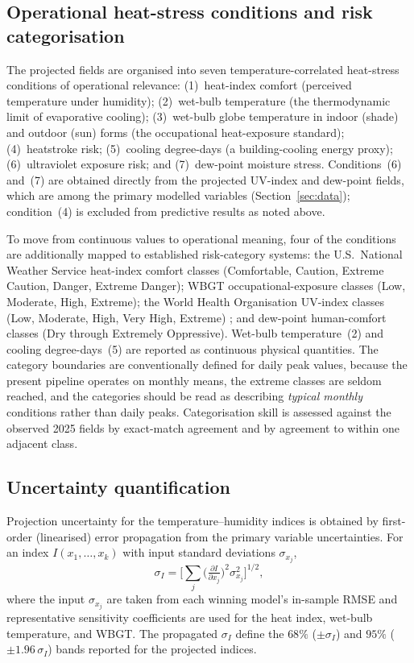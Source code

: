 \documentclass[pdflatex,sn-basic,lineno]{sn-jnl}
\begin{document}
\subsection{Operational heat-stress conditions and risk categorisation}
\label{sec:conditions}
The projected fields are organised into seven temperature-correlated heat-stress
conditions of operational relevance: (1)~heat-index comfort (perceived
temperature under humidity); (2)~wet-bulb temperature (the thermodynamic limit of
evaporative cooling); (3)~wet-bulb globe temperature in indoor (shade) and outdoor
(sun) forms (the occupational heat-exposure standard); (4)~heatstroke risk;
(5)~cooling degree-days (a building-cooling energy proxy); (6)~ultraviolet
exposure risk; and (7)~dew-point moisture stress. Conditions~(6) and~(7) are
obtained directly from the projected UV-index and dew-point fields, which are
among the primary modelled variables (Section~\ref{sec:data}); condition~(4) is
excluded from predictive results as noted above.

To move from continuous values to operational meaning, four of the conditions are
additionally mapped to established risk-category systems: the U.S.\ National
Weather Service heat-index comfort classes (Comfortable, Caution, Extreme
Caution, Danger, Extreme Danger); WBGT occupational-exposure classes (Low,
Moderate, High, Extreme); the World Health Organisation UV-index classes (Low,
Moderate, High, Very High, Extreme) \citep{who2002}; and dew-point human-comfort
classes (Dry through Extremely Oppressive). Wet-bulb temperature~(2) and cooling
degree-days~(5) are reported as continuous physical quantities. The category
boundaries are conventionally defined for daily peak values, because the present
pipeline operates on monthly means, the extreme classes are seldom reached, and
the categories should be read as describing \emph{typical monthly} conditions
rather than daily peaks. Categorisation skill is assessed against the observed
2025 fields by exact-match agreement and by agreement to within one adjacent
class.

\subsection{Uncertainty quantification}\label{sec:uncertainty}
Projection uncertainty for the temperature--humidity indices is obtained by
first-order (linearised) error propagation from the primary variable
uncertainties. For an index $I(x_1,\dots,x_k)$ with input standard deviations
$\sigma_{x_j}$,
\begin{equation}
\sigma_{I}=\Bigg[\sum_{j}\Big(\tfrac{\partial I}{\partial x_j}\Big)^{2}
\sigma_{x_j}^{2}\Bigg]^{1/2},
\label{eq:errprop}
\end{equation}
where the input $\sigma_{x_j}$ are taken from each winning model's in-sample
RMSE and representative sensitivity coefficients are used for the heat index,
wet-bulb temperature, and WBGT. The propagated $\sigma_{I}$ define the
$68\%$ ($\pm\sigma_{I}$) and $95\%$ ($\pm1.96\,\sigma_{I}$) bands reported for
the projected indices.
\end{document}
